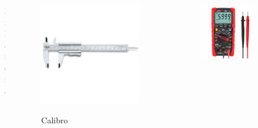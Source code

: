 \documentclass[handout]{beamer}
\theoremstyle{plain}
\begin{document}
\begin{frame}
\begin{columns}
\begin{column}{0.25\textwidth}
\begin{figure}
    Bilancia
  \end{figure}    
  \end{column}
  \begin{column}{0.25\textwidth}
  \begin{figure}
    \includegraphics[width=\columnwidth]{img/calibro.jpg}

    Calibro
  \end{figure}    
  \end{column}
  \begin{column}{0.25\textwidth}
  \begin{figure}
    \includegraphics[width=\columnwidth]{img/multimetro.jpg}


\end{figure}
\end{column}
\end{columns}
\end{frame}
\end{document}
